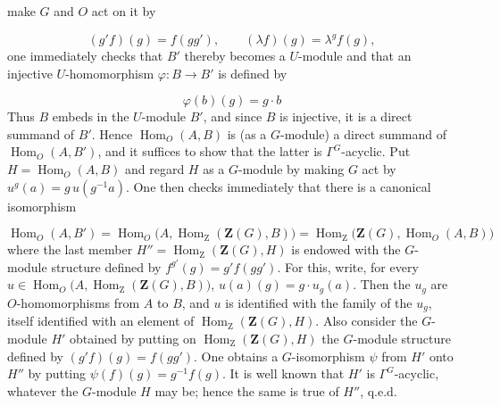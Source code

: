 \clearpage
{}

\noindent make $G$ and $O$ act on it by

\[
(g'f)(g)=f(gg'),
\qquad
(\lambda f)(g)=\lambda^g f(g),
\]
 one immediately checks that $B'$ thereby becomes a $U$-module and
that an injective $U$-homomorphism $\varphi:B\to B'$ is defined by

\[
\varphi(b)(g)=g\mathbin{\cdot}b
\]
Thus $B$ embeds in the $U$-module $B'$, and since $B$ is injective, it is a
direct summand of $B'$. Hence $\operatorname{Hom}_O(A,B)$ is (as a
$G$-module) a direct summand of $\operatorname{Hom}_O(A,B')$, and it suffices
to show that the latter is $\Gamma^G$-acyclic.
Put $H=\operatorname{Hom}_O(A,B)$ and regard $H$ as a $G$-module by making $G$
act by
$u^g(a)=g\,u(g^{-1}a)$.
One then checks immediately that there is a canonical isomorphism

\[
\operatorname{Hom}_O(A,B')
=\operatorname{Hom}_O
  \bigl(A,\operatorname{Hom}_{\mathrm Z}(\mathbf Z(G),B)\bigr)
=\operatorname{Hom}_{\mathrm Z}
  \bigl(\mathbf Z(G),\operatorname{Hom}_O(A,B)\bigr)
\]
 where the last member
$H''=\operatorname{Hom}_{\mathrm Z}(\mathbf Z(G),H)$ is endowed with the
$G$-module structure defined by
$f^{g'}(g)=g'f(gg')$.
For this, write, for every
$u\in\operatorname{Hom}_O
\bigl(A,\operatorname{Hom}_{\mathrm Z}(\mathbf Z(G),B)\bigr)$,
$u(a)(g)=g\mathbin{\cdot}u_g(a)$. Then the $u_g$ are $O$-homomorphisms from
$A$ to $B$, and $u$ is identified with the family of the $u_g$, itself
identified with an element of
$\operatorname{Hom}_{\mathrm Z}(\mathbf Z(G),H)$. Also consider the
$G$-module $H'$ obtained by putting on
$\operatorname{Hom}_{\mathrm Z}(\mathbf Z(G),H)$ the $G$-module structure
defined by
$(g'f)(g)=f(gg')$.
One obtains a $G$-isomorphism $\psi$ from $H'$ onto $H''$ by putting
$\psi(f)(g)=g^{-1}f(g)$.
It is well known that $H'$ is $\Gamma^G$-acyclic, whatever the $G$-module $H$
may be; hence the same is true of $H''$, q.e.d.

